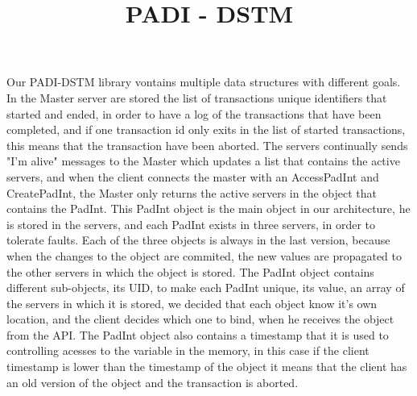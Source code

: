 \documentclass[times, 10pt,twocolumn]{article}
\begin{document}
\title{PADI - DSTM}



\maketitle
\thispagestyle{empty}











Our PADI-DSTM library vontains multiple data structures with different goals. In the Master server are stored the list of transactions unique identifiers that started and ended, in order to have a log of the transactions that have been completed, and if one transaction id only exits in the list of started transactions, this means that the transaction have been aborted. The servers continually sends "I'm alive" messages to the Master which updates a list that contains the active servers, and when the client connects the master with an AccessPadInt and CreatePadInt, the Master only returns the active servers in the object that contains the PadInt. This PadInt object is the main object in our architecture, he is stored in the servers, and each PadInt exists in three servers, in order to tolerate faults. Each of the three objects is always in the last version, because when the changes to the object are commited, the new values are propagated to the other servers in which the object is stored. The PadInt object contains different sub-objects, its UID, to make each PadInt unique, its value, an array of the servers in which it is stored, we decided that each object know it's own location, and the client decides which one to bind, when he receives the object from the API. The PadInt object also contains a timestamp that it is used to controlling acesses to the variable in the memory, in this case if the client timestamp is lower than the timestamp of the object it means that the client has an old version of the object and the transaction is aborted.
\end{document}
